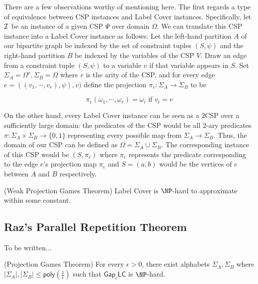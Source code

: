 There are a few observations worthy of mentioning here. The first regards a type of equivalence between CSP instances and Label Cover instances. Specifically, let $\mathcal{I}$ be an instance of a given CSP $\Psi$ over domain $\Omega$. We can translate this CSP instance into a Label Cover instance as follows: Let the left-hand partition $A$ of our bipartite graph be indexed by the set of constraint tuples $(S,\psi)$ and the right-hand partition $B$ be indexed by the variables of the CSP $V$. Draw an edge from a constraint tuple $(S,\psi)$ to a variable $v$ if that variable appears in $S$. Set $\Sigma_A = \Omega^r, \Sigma_B = \Omega$ where $r$ is the arity of the CSP, and for every edge $e = ((v_1,\cdots,v_r), \psi), v)$ define the projection $\pi_e:\Sigma_A \rightarrow \Sigma_B$ to be

\[ \pi_e(\omega_1, \cdots, \omega_r) =  \omega_i \text{ if } v_i = v\]\newline


On the other hand, every Label Cover instance can be seen as a $2$CSP over a sufficiently large domain: the predicates of the CSP would be all $2$-ary predicates $\pi:\Sigma_A \times \Sigma_B \rightarrow \{0,1\}$ representing every possible map from $\Sigma_A \rightarrow \Sigma_B$. Thus, the domain of our CSP can be defined as $\Omega = \Sigma_A \cup \Sigma_B$. The corresponding instance of this CSP would be $(S,\pi_e)$ where $\pi_e$ represents the predicate corresponding to the edge $e$'s projection map $\pi_e$ and $S = (a,b)$ would be the vertices of $e$ between $A$ and $B$ respectively.

\begin{theorem} (Weak Projection Games Theorem)
Label Cover is $\NP$-hard to approximate within some constant.
\end{theorem}


\subsection{Raz's Parallel Repetition Theorem}
To be written...

\begin{theorem} (Projection Games Theorem)
  For every $\epsilon > 0$, there exist alphabets $\Sigma_A, \Sigma_B$ where $|\Sigma_A|,|\Sigma_B| \leq \mathsf{poly}(\frac{1}{\epsilon})$ such that $\mathsf{Gap}_\epsilon\mathsf{LC}$ is $\NP$-hard.
\end{theorem}
